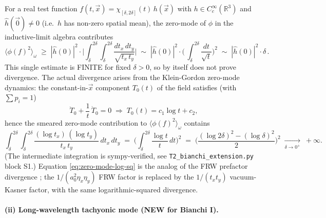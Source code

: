 \documentclass[11pt,a4paper]{article}
\theoremstyle{definition}
\newcommand{\R}{\mathbb{R}}
\begin{document}
For a real test function $f(t,\vec x)=\chi_{[\delta,2\delta]}(t)\,h(\vec x)$
with $h\in C_c^\infty(\R^3)$ and $\hat h(\vec 0)\neq 0$ (i.e.\ $h$ has
non-zero spatial mean), the zero-mode of $\phi$ in the inductive-limit
algebra contributes
\begin{equation}\label{eq:ind-zero-mode}
  \langle\phi(f)^2\rangle_{\omega}
  \;\ge\; |\hat h(0)|^2 \cdot
   \biggl|\!\!\int_\delta^{2\delta}\!\!\!\int_\delta^{2\delta}\!
       \frac{dt_x\,dt_y}{\sqrt{t_x\,t_y}}\biggr|
    \;\sim\;
   |\hat h(0)|^2 \cdot \biggl(\,\int_\delta^{2\delta}\!\!\frac{dt}{\sqrt t}\biggr)^{\!\!2}
    \;\sim\; |\hat h(0)|^2 \cdot \delta\,.
\end{equation}
This single estimate is FINITE for fixed $\delta>0$, so by itself does not
prove divergence. The actual divergence arises from the Klein-Gordon
zero-mode dynamics: the constant-in-$\vec x$ component $T_0(t)$ of the
field satisfies (with $\sum p_i=1$)
\begin{equation}
  \ddot T_0 + \frac{1}{t}\,\dot T_0 = 0
  \;\Longrightarrow\;
  T_0(t) = c_1\log t + c_2,
\end{equation}
hence the smeared zero-mode contribution to $\langle\phi(f)^2\rangle_\omega$
contains
\begin{equation}\label{eq:zero-mode-log-sq}
  \int_\delta^{2\delta}\!\!\!\int_\delta^{2\delta}\!
   \frac{(\log t_x)\,(\log t_y)}{t_x\,t_y}\,dt_x\,dt_y
  \;=\; \biggl(\int_\delta^{2\delta}\!\frac{\log t}{t}\,dt\biggr)^{\!\!2}
  \;=\; \biggl(\frac{(\log 2\delta)^2-(\log\delta)^2}{2}\biggr)^{\!\!2}
  \;\xrightarrow[\delta\to 0^+]{}\; +\infty.
\end{equation}
(The intermediate integration is sympy-verified, see
\texttt{T2\_bianchi\_extension.py} block S1.) Equation
\eqref{eq:zero-mode-log-sq} is the analog of the FRW prefactor divergence
\cite[CHECK 3]{Remondiere2026FRW}; the $1/(a_0^2\eta_x\eta_y)$ FRW factor
is replaced by the $1/(t_x t_y)$ vacuum-Kasner factor, with the same
logarithmic-squared divergence.

\paragraph{(ii) Long-wavelength tachyonic mode (NEW for Bianchi I).}
\end{document}
